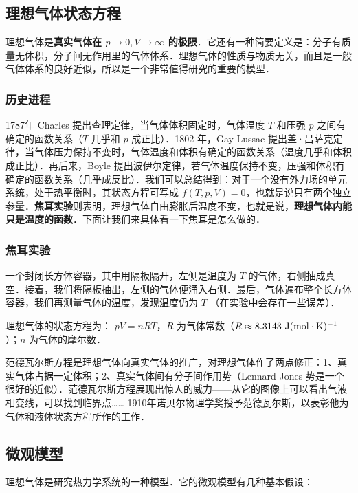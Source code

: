 
\subsection{理想气体状态方程}

理想气体是\textbf{真实气体在 $p\rightarrow 0,V\rightarrow \infty$ 的极限}．它还有一种简要定义是：分子有质量无体积，分子间无作用里的气体体系．理想气体的性质与物质无关，而且是一般气体体系的良好近似，所以是一个非常值得研究的重要的模型．
\subsubsection{历史进程}
1787年 Charles 提出查理定律，当气体体积固定时，气体温度 $T$ 和压强 $p$ 之间有确定的函数关系（$T$ 几乎和 $p$ 成正比）．1802 年，Gay-Lussac 提出盖·吕萨克定律，当气体压力保持不变时，气体温度和体积有确定的函数关系（温度几乎和体积成正比）．再后来，Boyle 提出波伊尔定律，若气体温度保持不变，压强和体积有确定的函数关系（几乎成反比）．我们可以总结得到：对于一个没有外力场的单元系统，处于热平衡时，其状态方程可写成 $f(T,p,V)=0$，也就是说只有两个独立参量．\textbf{焦耳实验}则表明，理想气体自由膨胀后温度不变，也就是说，\textbf{理想气体内能只是温度的函数}．下面让我们来具体看一下焦耳是怎么做的．
\subsubsection{焦耳实验}
一个封闭长方体容器，其中用隔板隔开，左侧是温度为 $T$ 的气体，右侧抽成真空．接着，我们将隔板抽出，左侧的气体便涌入右侧．最后，气体遍布整个长方体容器，我们再测量气体的温度，发现温度仍为 $T$ （在实验中会存在一些误差）．

理想气体的状态方程为： $pV=nRT$，$R$ 为气体常数（$R\approx 8.3143\ \rm{J}(\rm{mol\cdot K})^{-1}$）；$n$ 为气体的摩尔数．

范德瓦尔斯方程是理想气体向真实气体的推广，对理想气体作了两点修正：1、真实气体占据一定体积；2、真实气体间有分子间作用势（Lennard-Jones 势是一个很好的近似）．范德瓦尔斯方程展现出惊人的威力——从它的图像上可以看出气液相变线，可以找到临界点…… 1910年诺贝尔物理学奖授予范德瓦尔斯，以表彰他为气体和液体状态方程所作的工作．

\subsection{微观模型}

理想气体是研究热力学系统的一种模型．它的微观模型有几种基本假设：

